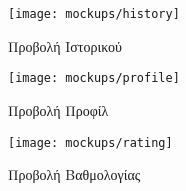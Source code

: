\begin{figure}[H]
    \centering
    \begin{subfigure}[b]{0.3\textwidth}
        \texttt{[image: mockups/history]}
        \caption{Προβολή Ιστορικού}
    \end{subfigure}
    \hfill
    \begin{subfigure}[b]{0.3\textwidth}
        \texttt{[image: mockups/profile]}
        \caption{Προβολή Προφίλ}
    \end{subfigure}
    \hfill
    \begin{subfigure}[b]{0.3\textwidth}
        \texttt{[image: mockups/rating]}
        \caption{Προβολή Βαθμολογίας}
    \end{subfigure}
    \caption{}
\end{figure}





